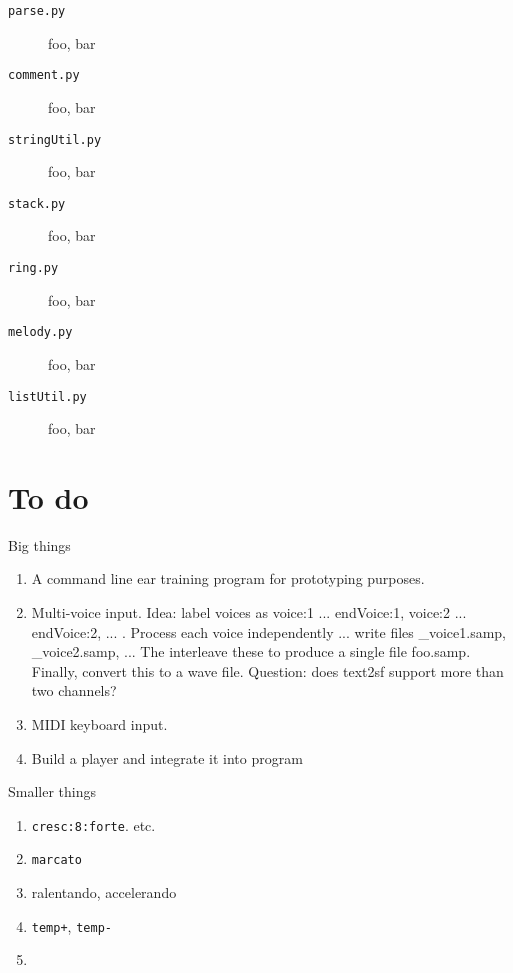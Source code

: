 \documentclass[11pt]{amsart}
\begin{document}
\begin{description}
\item[{\tt parse.py }] foo, bar
\item[{\tt comment.py }] foo, bar
\item[{\tt stringUtil.py }] foo, bar


\item[{\tt stack.py }] foo, bar
\item[{\tt ring.py }] foo, bar
\item[{\tt melody.py }] foo, bar


\item[{\tt listUtil.py }] foo, bar



 \end{description}

\section{To do}


Big things

\begin{enumerate}

  \item A command line ear training program for prototyping purposes.

  \item Multi-voice input.  Idea: label voices as voice:1 ... endVoice:1,
  voice:2 ... endVoice:2, ...  .  Process each voice independently ... 
  write files \_voice1.samp, \_voice2.samp, ... The interleave these to
  produce a single file foo.samp.  Finally, convert this to a wave file.
  Question:  does text2sf support more than two channels?
  
  \item MIDI keyboard input.

  \item Build a player and integrate it into program
  
  
\end{enumerate}

Smaller things

\begin{enumerate}

\item {\tt cresc:8:forte}. etc.

\item {\tt marcato}

\item ralentando, accelerando

\item {\tt temp+}, {\tt temp-}

\item

\end{enumerate}
\end{document}

